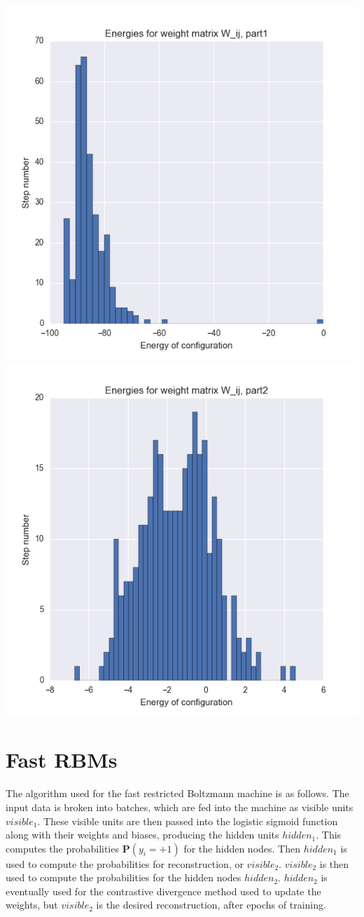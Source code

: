 \documentclass[11pt]{amsart}
\theoremstyle{remark}
\theoremstyle{remark}
\numberwithin{equation}{section}
\newcommand{\Prob}{\mathbf{P}}
\begin{document}
	\graphicspath{ {../Images/genericBM/} }
\begin{center}
 \includegraphics[width=.5\textwidth]{energies1.png}\hfill
  \includegraphics[width=.5\textwidth]{energies2.png}
\end{center}


\section{Fast RBMs}


	The algorithm used for the fast restricted Boltzmann machine is as follows. 
	The input data is broken into batches, which are fed into the machine as 
	visible units $visible_1$. These visible units are then passed into the logistic 
	sigmoid function along with their weights and biases, producing the hidden 
	units $hidden_1$. This computes the probabilities $\Prob(y_i = +1)$ for 
	the hidden nodes. Then $hidden_1$ is used to compute the probabilities for 
	reconstruction, or $visible_2$. $visible_2$ is then used to compute the
	probabilities for the hidden nodes $hidden_2$. $hidden_2$ is eventually 
	used for the contrastive divergence method used to update the weights, 
	but $visible_2$ is the desired reconstruction, after epochs 
	of training.
	
\end{document}
